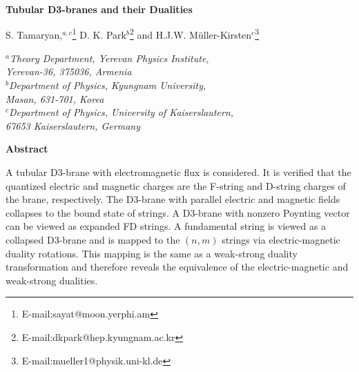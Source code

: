 \documentclass[a4paper,12pt]{article}
\begin{document}
\setlength{\textheight}{9.4in}
\setlength{\topmargin}{-0.6in}
\setlength{\oddsidemargin}{0.15in}
\setlength{\evensidemargin}{0.4in}
\renewcommand{\thefootnote}{\fnsymbol{footnote}}
\newcommand{\e}{{\bf E}}
\newcommand{\m}{{\bf B}}
\newcommand{\h}{{\bf H}}
\renewcommand{\d}{{\bf D}}
\rightline{}

\vspace{1cm}

\begin{center}
{\Large {\bf Tubular D3-branes and their Dualities}}
\vspace{1truecm}

\large 
{S. Tamaryan,${}^{a,c}$\footnote[1]
{E-mail:sayat@moon.yerphi.am}
D. K. Park${}^{b}$\footnote[2]
{E-mail:dkpark@hep.kyungnam.ac.kr}
and H.J.W. M\"uller-Kirsten${}^c$\footnote[3]
{E-mail:mueller1@physik.uni-kl.de}}

\vspace{0.8cm}

\normalsize
${}^a${\it  Theory Department, Yerevan Physics Institute,\\ 
Yerevan-36, 375036, Armenia}\\
\vspace{0.4cm}
${}^b${\it Department of Physics, Kyungnam University,\\ 
Masan, 631-701, Korea}\\
\vspace{0.4cm}
${}^c${\it Department of  Physics, University of Kaiserslautern,\\ 
67653 Kaiserslautern, Germany}
\end{center}
\vspace{0.6cm}

{\centerline {\bf Abstract}}

\vspace{0.4cm}

A tubular D3-brane with electromagnetic flux is considered. It is verified 
that the quantized electric and magnetic charges are the F-string and D-string 
charges of the brane, respectively. The D3-brane with parallel electric 
and magnetic fields collapses to the bound state of strings. A D3-brane with 
nonzero Poynting vector can be viewed as expanded FD strings. A 
fundamental string is viewed as a collapsed D3-brane and is mapped to the 
$(n,m)$ strings via electric-magnetic duality rotations. This mapping is 
the same as a weak-strong duality transformation and therefore reveals the 
equivalence of the electric-magnetic and weak-strong dualities.
\end{document}
